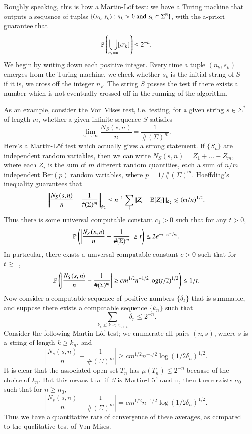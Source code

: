 \begin{remark}
    Roughly speaking, this is how a Martin-L\"{o}f test: we have a Turing machine that outputs a sequence of tuples $\{ (n_k,s_k) : n_k > 0\ \text{and}\ s_k \in \Sigma^{\operatorname{\mathbb{N}}} \}$, with the a-priori guarantee that
    \[ \operatorname{\mathbb{P}} \left( \bigcup_{n_k = n} [\sigma_k] \right) \leq 2^{-n}. \]
    We begin by writing down each positive integer. Every time a tuple $(n_k,s_k)$ emerges from the Turing machine, we check whether $s_k$ is the initial string of $S$ - if it is, we cross off the integer $n_k$. The string $S$ passes the test if there exists a number which is not eventually crossed off in the running of the algorithm.
\end{remark}

As an example, consider the Von Mises test, i.e. testing, for a given string $s \in \Sigma^*$ of length $m$, whether a given infinite sequence $S$ satisfies
%
\[ \lim_{n \to \infty} \frac{N_S(s,n)}{n} = \frac{1}{\#(\Sigma)^m}. \]
%
Here's a Martin-L\"{o}f test which actually gives a strong statement. If $\{ S_n \}$ are independent random variables, then we can write $N_S(s,n) = Z_1 + \dots + Z_m$, where each $Z_i$ is the sum of $m$ different random quantities, each a sum of $n/m$ independent $\text{Ber}(p)$ random variables, where $p = 1/\#(\Sigma)^m$. Hoeffding's inequality guarantees that
%
\[ \left\| \frac{N_S(s,n)}{n} - \frac{1}{\#(\Sigma)^m} \right\|_{\psi_2} \leq n^{-1} \sum_i \| Z_i - \operatorname{\mathbb{E}}[Z_i] \|_{\psi_2} \lesssim (m/n)^{1/2}. \]
%
Thus there is some universal computable constant $c_1 > 0$ such that for any $t > 0$,
%
\[ \operatorname{\mathbb{P}} \left( \left| \frac{N_S(s,n)}{n} - \frac{1}{\#(\Sigma)^m} \right| \geq t \right) \leq 2 e^{- c_1 n t^2/m}. \]
%
In particular, there exists a universal computable constant $c > 0$ such that for $t \gtrsim 1$,
%
\[ \operatorname{\mathbb{P}} \left( \left| \frac{N_S(s,n)}{n} - \frac{1}{\#(\Sigma)^m} \right| \geq c m^{1/2} n^{-1/2} \log(t/2)^{1/2} \right) \leq 1/t. \]
%
Now consider a computable sequence of positive numbers $\{ \delta_k \}$ that is summable, and suppose there exists a computable sequence $\{ k_n \}$ such that
%
\[ \sum_{k_n \leq k < k_{n+1}} \delta_n \leq 2^{-n}. \]
%
Consider the following Martin-L\"{o}f test; we enumerate all pairs $(n,s)$, where $s$ is a string of length $k \geq k_n$, and
%
\[ \left| \frac{N_s(s,n)}{n} - \frac{1}{\#(\Sigma)^m} \right| \geq c m^{1/2} n^{-1/2} \log(1/2 \delta_n)^{1/2}. \]
%
It is clear that the associated open set $T_n$ has $\mu(T_n) \leq 2^{-n}$ because of the choice of $k_n$. But this means that if $S$ is Martin-L\"{o}f randm, then there exists $n_0$ such that for $n \geq n_0$,
%
\[ \left| \frac{N_s(s,n)}{n} - \frac{1}{\#(\Sigma)^m} \right| = c m^{1/2} n^{-1/2} \log(1/2 \delta_n)^{1/2}. \]
%
Thus we have a quantitative rate of convergence of these averages, as compared to the qualitative test of Von Mises.

